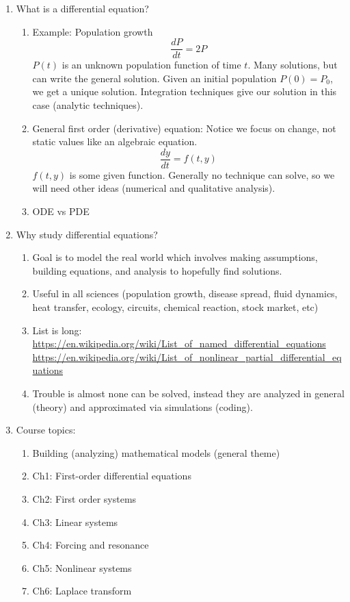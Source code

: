 \documentclass{article}
\begin{document}
\begin{enumerate}

\item What is a differential equation?
\begin{enumerate}

\item Example: Population growth
\[
\frac{dP}{dt} = 2P
\]
$P(t)$ is an unknown population function of time $t$. Many solutions, but can write the general solution. Given an initial population $P(0) = P_0$, we get a unique solution. Integration techniques give our solution in this case (analytic techniques).

\item General first order (derivative) equation: Notice we focus on change, not static values like an algebraic equation.
\[
\frac{dy}{dt} = f(t,y)
\]
$f(t,y)$ is some given function. Generally no technique can solve, so we will need other ideas (numerical and qualitative analysis).

\item ODE vs PDE

\end{enumerate}

\item Why study differential equations?
\begin{enumerate}

\item Goal is to model the real world which involves making assumptions, building equations, and analysis to hopefully find solutions. 

\item Useful in all sciences (population growth, disease spread, fluid dynamics, heat transfer, ecology, circuits, chemical reaction, stock market, etc)

\item List is long: \url{https://en.wikipedia.org/wiki/List_of_named_differential_equations} \url{https://en.wikipedia.org/wiki/List_of_nonlinear_partial_differential_equations}

\item Trouble is almost none can be solved, instead they are analyzed in general (theory) and approximated via simulations (coding).
\end{enumerate}

\item Course topics:
\begin{enumerate}
\item Building (analyzing) mathematical models (general theme)
\item Ch1: First-order differential equations
\item Ch2: First order systems
\item Ch3: Linear systems
\item Ch4: Forcing and resonance
\item Ch5: Nonlinear systems
\item Ch6: Laplace transform
\end{enumerate}

\end{enumerate}
\end{document}
